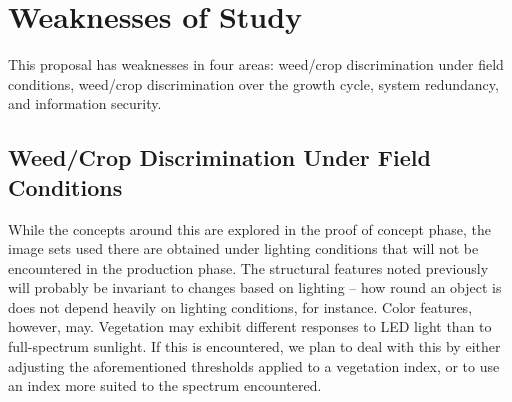 \documentclass[12pt]{article}
\begin{document}
 \newpage
%
%
\section{Weaknesses of Study}
This proposal has weaknesses in four areas: weed/crop discrimination under field conditions, weed/crop discrimination over the growth cycle, system redundancy, and information security.

\subsection{Weed/Crop Discrimination Under Field Conditions}
While the concepts around this are explored in the proof of concept phase, the image sets used there are obtained under lighting conditions that will  not be encountered in the production phase. The structural features noted previously will probably be invariant to changes based on lighting -- how round an object is does not depend heavily on lighting conditions, for instance. Color features, however, may. Vegetation may exhibit different responses to LED light than to full-spectrum sunlight. If this is encountered, we plan to deal with this by either adjusting the aforementioned thresholds applied to a vegetation index, or to use an index more suited to the spectrum encountered.

\end{document}
